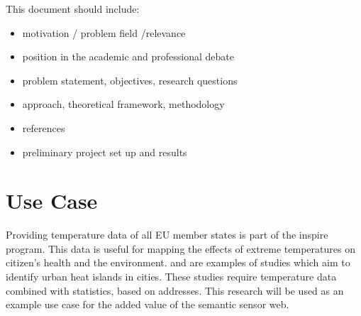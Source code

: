 This document should include:

\begin{itemize} 
\item motivation / problem field /relevance

\item position in the academic and professional debate

\item problem statement, objectives, research questions

\item approach, theoretical framework, methodology

\item references

\item preliminary project set up and results

\end{itemize}


\section{Use Case}
Providing temperature data of all EU member states is part of the \ac{inspire} program. This data is useful for mapping the effects of extreme temperatures on citizen's health and the environment. \cite{UC:vanderHoeven} and \cite{UC:vanderHoeven2} are examples of studies which aim to identify urban heat islands in cities. These studies require temperature data combined with statistics, based on addresses. This research will be used as an example use case for the added value of the semantic sensor web. 
 

\fi